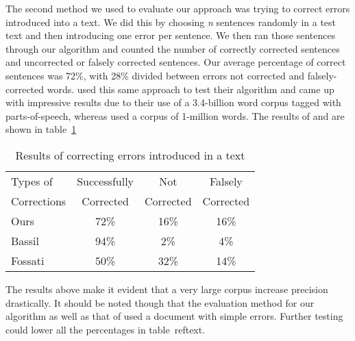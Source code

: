 \documentclass[twocolumn]{article}
\begin{document}
The second method we used to evaluate our approach was trying to correct errors introduced into a text. We did this by choosing \emph{n} sentences randomly in a test text and then introducing one error per sentence. We then ran those sentences through our algorithm and counted the number of correctly corrected sentences and uncorrected or falsely corrected sentences. Our average percentage of correct sentences was 72\%, with 28\% divided between errors not corrected and falsely-corrected words. \cite{Bassil12} used this same approach to test their algorithm and came up with impressive results due to their use of a 3.4-billion word corpus tagged with parts-of-speech, whereas \cite{Fossati07} used a corpus of 1-million words. The results of \cite{Bassil12} and \cite{Fossati07} are shown in table~\ref{text}

\begin{table}[h]
\centering
\begin{tabular}{ | l | c | c | c | }
\hline
Types of & Successfully & Not & Falsely \\
Corrections & Corrected & Corrected & Corrected \\
\hline
Ours & 72\% & 16\% & 16\% \\
\hline
Bassil\cite{Bassil12} & 94\% & 2\% & 4\% \\
\hline
Fossati\cite{Fossati07} & 50\% & 32\% & 14\% \\
\hline
\end{tabular}
\caption{Results of correcting errors introduced in a text}
\label{text}
\end{table} 

The results above make it evident that a very large corpus increase precision drastically. It should be noted though that the evaluation method for our algorithm as well as that of \cite{Bassil12} used a document with simple errors. Further testing could lower all the percentages in table~ref{text}.
\end{document}
